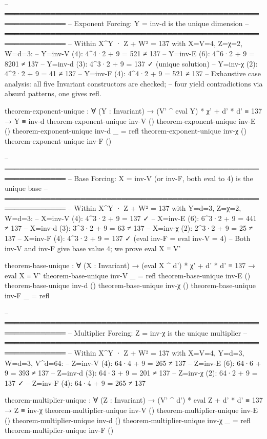 \documentclass[11pt,a4paper]{article}
\begin{document}
\begin{code}
-- ══════════════════════════════════════════════════════════════
-- Exponent Forcing: Y = inv-d is the unique dimension
-- ══════════════════════════════════════════════════════════════
-- Within X^Y · Z + W² = 137 with X=V=4, Z=χ=2, W=d=3:
-- Y=inv-V (4): 4^4·2 + 9 = 521 ≠ 137
-- Y=inv-E (6): 4^6·2 + 9 = 8201 ≠ 137
-- Y=inv-d (3): 4^3·2 + 9 = 137 ✓  (unique solution)
-- Y=inv-χ (2): 4^2·2 + 9 = 41 ≠ 137
-- Y=inv-F (4): 4^4·2 + 9 = 521 ≠ 137
-- Exhaustive case analysis: all five Invariant constructors are checked;
-- four yield contradictions via absurd patterns, one gives refl.

theorem-exponent-unique : ∀ (Y : Invariant) →
  (V' ^ eval Y) * χ' + d' * d' ≡ 137 → Y ≡ inv-d
theorem-exponent-unique inv-V ()
theorem-exponent-unique inv-E ()
theorem-exponent-unique inv-d _ = refl
theorem-exponent-unique inv-χ ()
theorem-exponent-unique inv-F ()
\end{code}

\begin{code}
-- ══════════════════════════════════════════════════════════════
-- Base Forcing: X = inv-V (or inv-F, both eval to 4) is the unique base
-- ══════════════════════════════════════════════════════════════
-- Within X^Y · Z + W² = 137 with Y=d=3, Z=χ=2, W=d=3:
-- X=inv-V (4): 4^3·2 + 9 = 137 ✓
-- X=inv-E (6): 6^3·2 + 9 = 441 ≠ 137
-- X=inv-d (3): 3^3·2 + 9 = 63 ≠ 137
-- X=inv-χ (2): 2^3·2 + 9 = 25 ≠ 137
-- X=inv-F (4): 4^3·2 + 9 = 137 ✓ (eval inv-F = eval inv-V = 4)
-- Both inv-V and inv-F give base value 4; we prove eval X ≡ V'

theorem-base-unique : ∀ (X : Invariant) →
  (eval X ^ d') * χ' + d' * d' ≡ 137 → eval X ≡ V'
theorem-base-unique inv-V _ = refl
theorem-base-unique inv-E ()
theorem-base-unique inv-d ()
theorem-base-unique inv-χ ()
theorem-base-unique inv-F _ = refl
\end{code}

\begin{code}
-- ══════════════════════════════════════════════════════════════
-- Multiplier Forcing: Z = inv-χ is the unique multiplier
-- ══════════════════════════════════════════════════════════════
-- Within X^Y · Z + W² = 137 with X=V=4, Y=d=3, W=d=3, V^d=64:
-- Z=inv-V (4): 64·4 + 9 = 265 ≠ 137
-- Z=inv-E (6): 64·6 + 9 = 393 ≠ 137
-- Z=inv-d (3): 64·3 + 9 = 201 ≠ 137
-- Z=inv-χ (2): 64·2 + 9 = 137 ✓
-- Z=inv-F (4): 64·4 + 9 = 265 ≠ 137

theorem-multiplier-unique : ∀ (Z : Invariant) →
  (V' ^ d') * eval Z + d' * d' ≡ 137 → Z ≡ inv-χ
theorem-multiplier-unique inv-V ()
theorem-multiplier-unique inv-E ()
theorem-multiplier-unique inv-d ()
theorem-multiplier-unique inv-χ _ = refl
theorem-multiplier-unique inv-F ()
\end{code}
\end{document}
